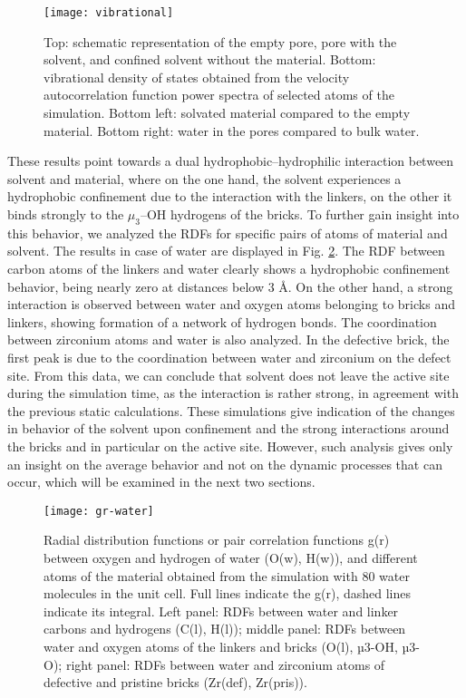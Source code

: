 \begin{figure}[!htbp]
	\centering
	\texttt{[image: vibrational]}
	\caption{Top: schematic representation of the empty pore, pore with the solvent, and confined solvent without the material. Bottom: vibrational density of states obtained from the velocity autocorrelation function power spectra of selected atoms of the simulation. Bottom left: solvated material compared to the empty material. Bottom right: water in the pores compared to bulk water.}
	\label{fig:vibrational}
\end{figure}
\npar
These results point towards a dual hydrophobic--hydrophilic interaction between solvent and material, where on the one hand, the solvent experiences a hydrophobic confinement due to the interaction with the linkers, on the other it binds strongly to the $\mu_3$--OH hydrogens of the bricks. To further gain insight into this behavior, we analyzed the RDFs for specific pairs of atoms of material and solvent. The results in case of water are displayed in Fig. \ref{fig:gr-water}. The RDF between carbon atoms of the linkers and water clearly shows a hydrophobic confinement behavior, being nearly zero at distances below 3 \AA. On the other hand, a strong interaction is observed between water and oxygen atoms belonging to bricks and linkers, showing formation of a network of hydrogen bonds. The coordination between zirconium atoms and water is also analyzed. In the defective brick, the first peak is due to the coordination between water and zirconium on the defect site. 
\npar
From this data, we can conclude that solvent does not leave the active site during the simulation time, as the interaction is rather strong, in agreement with the previous static calculations. These simulations give indication of the changes in behavior of the solvent upon confinement and the strong interactions around the bricks and in particular on the active site. However, such analysis gives only an insight on the average behavior and not on the dynamic processes that can occur, which will be examined in the next two sections. 

\begin{figure}[!htbp]
	\centering
	\texttt{[image: gr-water]}
	\caption{Radial distribution functions or pair correlation functions g(r) between oxygen and hydrogen of water (O(w), H(w)), and different atoms of the material obtained from the simulation with 80 water molecules in the unit cell. Full lines indicate the g(r), dashed lines indicate its integral. Left panel: RDFs between water and linker carbons and hydrogens (C(l), H(l)); middle panel: RDFs between water and oxygen atoms of the linkers and bricks (O(l), µ3-OH, µ3-O); right panel: RDFs between water and zirconium atoms of defective and pristine bricks (Zr(def), Zr(pris)). }
	\label{fig:gr-water}
\end{figure}


